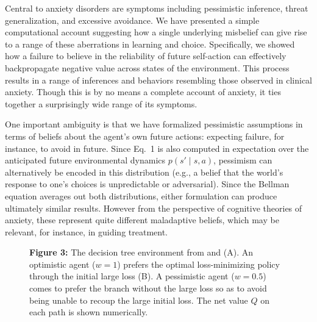 \documentclass[11pt]{article} %
\begin{document}
Central to anxiety disorders are symptoms including pessimistic inference, threat generalization, and excessive avoidance. We have presented a simple computational account suggesting how a single underlying misbelief can give rise to a range of these aberrations in learning and choice. Specifically, we showed how a failure to believe in the reliability of future self-action can effectively backpropagate negative value across states of the environment. This process results in a range of inferences and behaviors resembling those observed in clinical anxiety. Though this is by no means a complete account of anxiety, it ties together a surprisingly wide range of its symptoms.

One important ambiguity is that we have formalized pessimistic assumptions in terms of beliefs about the agent's own future actions: expecting failure, for instance, to avoid in future. Since Eq.~1 is also computed in expectation over the anticipated future environmental dynamics $p(s' \mid s,a)$, pessimism can alternatively be encoded in this distribution (e.g., a belief that the world's response to one's choices is unpredictable or adversarial). Since the Bellman equation averages out both distributions, either formulation can produce ultimately similar results. However from the perspective of cognitive theories of anxiety, these represent quite different maladaptive beliefs, which may be relevant, for instance, in guiding treatment.

\begin{figure}[!b]
  \centerline{%
  }
  \par \textbf{Figure 3:} The decision tree environment from \cite{Huys2012} and \cite{Lally2017} (A). An optimistic agent ($w=1$) prefers the optimal loss-minimizing policy through the initial large loss (B). A pessimistic agent ($w=0.5$) comes to prefer the branch without the large loss so as to avoid being unable to recoup the large initial loss. The net value $Q$ on each path is shown numerically.
\end{figure}
\end{document}
